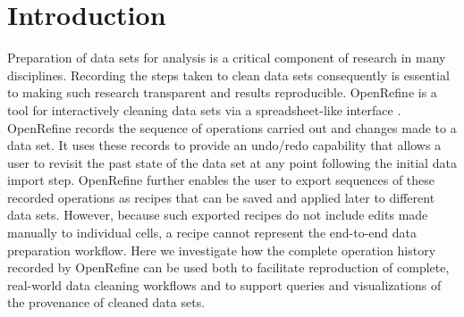 \section{Introduction}

Preparation of data sets for analysis is a critical component of research in many disciplines. Recording the steps taken to clean data sets consequently is essential to making such research transparent and results reproducible. OpenRefine is a tool for interactively cleaning data sets via a spreadsheet-like interface \cite{verborgh_using_2013}. OpenRefine records the sequence of operations carried out and changes made to a data set. It uses these records to provide an undo/redo capability that allows a user to revisit the past state of the data set at any point following the initial data import step. OpenRefine further enables the user to export sequences of these recorded operations as recipes that can be saved and applied later to different data sets.  However, because such exported recipes do not include edits made manually to individual cells, a recipe cannot represent the end-to-end data preparation workflow. Here we investigate how the complete operation history recorded by OpenRefine can be used both to facilitate reproduction of complete, real-world data cleaning workflows and to support queries and visualizations of the provenance of cleaned data sets.

